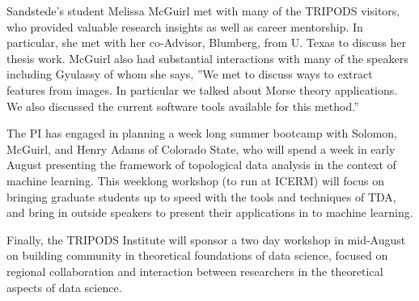 Sandstede's student Melissa McGuirl met with many of the TRIPODS visitors, who provided valuable research insights as well as career mentorship. In particular, she met with her co-Advisor, Blumberg, from U. Texas to discuss her thesis work. McGuirl also had substantial interactions with many of the speakers including Gyulassy of whom she says, ''We met to discuss ways to extract features from images. In particular we talked about Morse theory applications. We also discussed the current software tools available for this method.''

The PI has engaged in planning a week long summer bootcamp with Solomon, McGuirl, and Henry Adams of Colorado State, who will spend a week in early August presenting the framework of topological data analysis in the context of machine learning. This weeklong workshop (to run at ICERM) will focus on bringing graduate students up to speed with the tools and techniques of TDA, and bring in outside speakers to present their applications in to machine learning.

Finally, the TRIPODS Institute will sponsor a two day workshop in mid-August on building community in theoretical foundations of data science, focused on regional collaboration and interaction between researchers in the theoretical aspects of data science.
